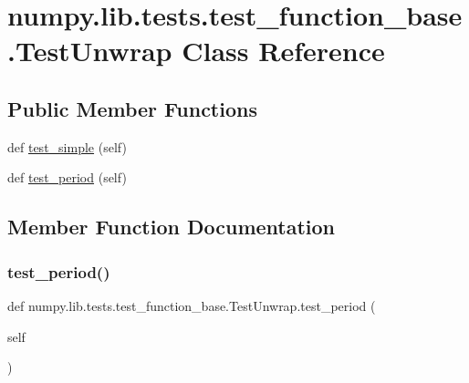 \hypertarget{classnumpy_1_1lib_1_1tests_1_1test__function__base_1_1TestUnwrap}{}\section{numpy.\+lib.\+tests.\+test\+\_\+function\+\_\+base.\+Test\+Unwrap Class Reference}
\label{classnumpy_1_1lib_1_1tests_1_1test__function__base_1_1TestUnwrap}
\subsection*{Public Member Functions}
\begin{DoxyCompactItemize}
\item 
def \hyperlink{classnumpy_1_1lib_1_1tests_1_1test__function__base_1_1TestUnwrap_a78460ea57ea87d239f1385d40e72c18f}{test\+\_\+simple} (self)
\item 
def \hyperlink{classnumpy_1_1lib_1_1tests_1_1test__function__base_1_1TestUnwrap_ac7d6db5471dbc44bae528ee34678680c}{test\+\_\+period} (self)
\end{DoxyCompactItemize}


\subsection{Member Function Documentation}
\mbox{\label{classnumpy_1_1lib_1_1tests_1_1test__function__base_1_1TestUnwrap_ac7d6db5471dbc44bae528ee34678680c}} 
\subsubsection{\texorpdfstring{test\+\_\+period()}{test\_period()}}
{\footnotesize\ttfamily def numpy.\+lib.\+tests.\+test\+\_\+function\+\_\+base.\+Test\+Unwrap.\+test\+\_\+period (\begin{DoxyParamCaption}\item[{}]{self }\end{DoxyParamCaption})}

